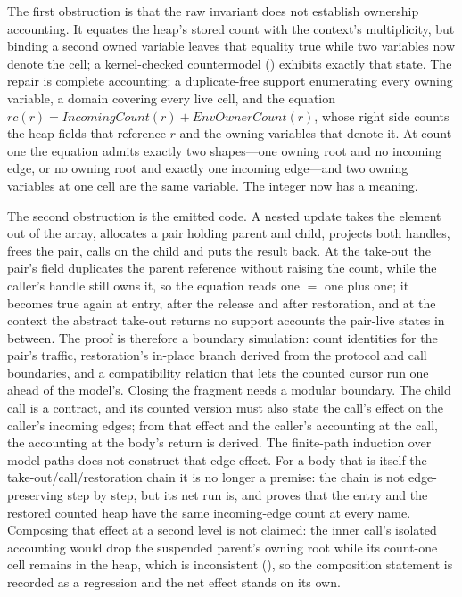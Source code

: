 \documentclass[a4paper,UKenglish,cleveref]{lipics-v2021}
\begin{document}
The first obstruction is that the raw invariant does not establish ownership
accounting. It equates the heap's stored count with the context's multiplicity, but
binding a second owned variable leaves that equality true while two variables now
denote the cell; a kernel-checked countermodel ()
exhibits exactly that state. The repair is complete accounting: a duplicate-free
support enumerating every owning variable, a domain covering every live cell, and
the equation
$\mathit{rc}(r) = \mathit{IncomingCount}(r) + \mathit{EnvOwnerCount}(r)$, whose
right side counts the heap fields that reference $r$ and the owning variables that
denote it. At count one the equation admits exactly two shapes---one owning root
and no incoming edge, or no owning root and exactly one incoming edge---and two
owning variables at one cell are the same variable. The integer now has a
meaning.

The second obstruction is the emitted code. A nested update takes the element out
of the array, allocates a pair holding parent and child, projects both handles,
frees the pair, calls on the child and puts the result back. At the take-out the
pair's field duplicates the parent reference without raising the count, while the
caller's handle still owns it, so the equation reads one $=$ one plus one; it
becomes true again at entry, after the release and after restoration, and at the
context the abstract take-out returns no support accounts the pair-live states in
between. The proof is therefore a boundary simulation: count
identities for the pair's traffic, restoration's in-place branch derived from the
protocol and call boundaries, and a compatibility relation that lets the counted
cursor run one ahead of the model's. Closing the fragment needs a modular
boundary. The child call is a contract, and its counted version must also state
the call's effect on the caller's incoming edges; from that effect and the
caller's accounting at the call, the accounting at the body's return is derived.
The finite-path induction over model paths does not construct that edge effect.
For a body that is itself the take-out/call/restoration chain it is no longer a
premise: the chain is not edge-preserving step by step, but its net run is, and
 proves that the entry and the restored
counted heap have the same incoming-edge count at every name. Composing that
effect at a second level is not claimed: the inner call's isolated accounting
would drop the suspended parent's owning root while its count-one cell remains in
the heap, which is inconsistent (), so the
composition statement is recorded as a regression and the net effect stands on its
own.
\end{document}
